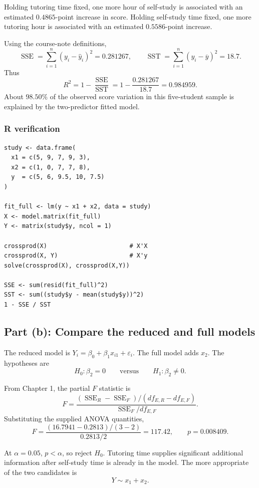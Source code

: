 ﻿\documentclass[11pt]{article}
\newcommand{\SSE}{\operatorname{SSE}}
\newcommand{\SST}{\operatorname{SST}}
\newcommand{\Rtwo}{R^2}
\begin{document}
Holding tutoring time fixed, one more hour of self-study is associated with
an estimated $0.4865$-point increase in score. Holding self-study time fixed,
one more tutoring hour is associated with an estimated $0.5586$-point increase.

Using the course-note definitions,
\[
  \SSE=\sum_{i=1}^n(y_i-\widehat y_i)^2=0.281267,
  \qquad
  \SST=\sum_{i=1}^n(y_i-\overline y)^2=18.7.
\]
Thus
\[
  \boxed{
  \Rtwo=1-\frac{\SSE}{\SST}
  =1-\frac{0.281267}{18.7}
  =0.984959.}
\]
About $98.50\%$ of the observed score variation in this five-student sample is
explained by the two-predictor fitted model.

\subsubsection*{R verification}

\begin{lstlisting}
study <- data.frame(
  x1 = c(5, 9, 7, 9, 3),
  x2 = c(1, 0, 7, 7, 8),
  y  = c(5, 6, 9.5, 10, 7.5)
)

fit_full <- lm(y ~ x1 + x2, data = study)
X <- model.matrix(fit_full)
Y <- matrix(study$y, ncol = 1)

crossprod(X)                       # X'X
crossprod(X, Y)                    # X'y
solve(crossprod(X), crossprod(X,Y))

SSE <- sum(resid(fit_full)^2)
SST <- sum((study$y - mean(study$y))^2)
1 - SSE / SST
\end{lstlisting}

\subsection{Part (b): Compare the reduced and full models}

The reduced model is $Y_i=\beta_0+\beta_1x_{i1}+\varepsilon_i$.
The full model adds $x_2$. The hypotheses are
\[
  H_0:\beta_2=0
  \qquad\text{versus}\qquad
  H_1:\beta_2\ne 0.
\]

From Chapter 1, the partial $F$ statistic is
\[
F=
\frac{(\SSE_R-\SSE_F)/(df_{E,R}-df_{E,F})}
     {\SSE_F/df_{E,F}}.
\]
Substituting the supplied ANOVA quantities,
\[
F=
\frac{(16.7941-0.2813)/(3-2)}{0.2813/2}
=117.42,
\qquad p=0.008409.
\]

At $\alpha=0.05$, $p<\alpha$, so reject $H_0$. Tutoring time supplies
significant additional information after self-study time is already in the
model. The more appropriate of the two candidates is
\[
  \boxed{Y\sim x_1+x_2.}
\]
\end{document}
